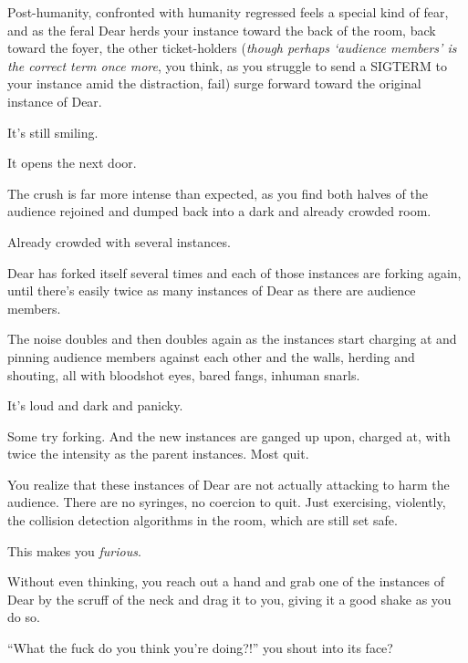 Post-humanity, confronted with humanity regressed feels a special kind of fear, and as the feral Dear herds your instance toward the back of the room, back toward the foyer, the other ticket-holders (\emph{though perhaps `audience members' is the correct term once more}, you think, as you struggle to send a SIGTERM to your instance amid the distraction, fail) surge forward toward the original instance of Dear.

\vfill
\newpage

\null
\vfill

It's still smiling.

\null
\vfill

\newpage
\null
\vfill

It opens the next door.

\vfill

\newpage

The crush is far more intense than expected, as you find both halves of the audience rejoined and dumped back into a dark and already crowded room.

Already crowded with several instances.

Dear has forked itself several times and each of those instances are forking again, until there's easily twice as many instances of Dear as there are audience members.

The noise doubles and then doubles again as the instances start charging at and pinning audience members against each other and the walls, herding and shouting, all with bloodshot eyes, bared fangs, inhuman snarls.

It's loud and dark and panicky.

Some try forking. And the new instances are ganged up upon, charged at, with twice the intensity as the parent instances. Most quit.

You realize that these instances of Dear are not actually attacking to harm the audience. There are no syringes, no coercion to quit. Just exercising, violently, the collision detection algorithms in the room, which are still set safe.

This makes you \emph{furious}.


Without even thinking, you reach out a hand and grab one of the instances of Dear by the scruff of the neck and drag it to you, giving it a good shake as you do so.

``What the fuck do you think you're doing?!'' you shout into its face?

